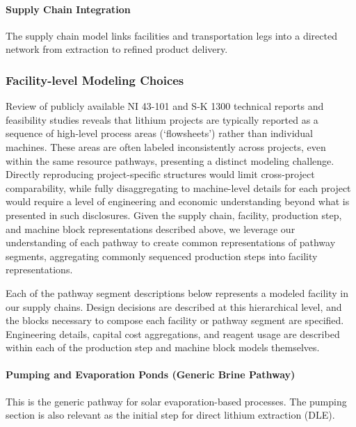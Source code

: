 \documentclass{article}
\renewcommand\_{\textunderscore\allowbreak}
\begin{document}
\paragraph{Supply Chain Integration}\label{app:04-methods-system-sc}\leavevmode\par

The supply chain model links facilities and transportation legs into a directed network from extraction to refined product delivery.

\clearpage
\subsubsection{Facility-level Modeling Choices}\label{app:04-methods-facilitychoices}

Review of publicly available NI 43-101 and S-K 1300 technical reports and feasibility studies reveals that lithium projects are typically reported as a sequence of high-level process areas (`flowsheets') rather than individual machines. These areas are often labeled inconsistently across projects, even within the same resource pathways, presenting a distinct modeling challenge. Directly reproducing project-specific structures would limit cross-project comparability, while fully disaggregating to machine-level details for each project would require a level of engineering and economic understanding beyond what is presented in such disclosures. Given the supply chain, facility, production step, and machine block representations described above, we leverage our understanding of each pathway to create common representations of pathway segments, aggregating commonly sequenced production steps into facility representations.

Each of the pathway segment descriptions below represents a modeled facility in our supply chains. Design decisions are described at this hierarchical level, and the blocks necessary to compose each facility or pathway segment are specified. Engineering details, capital cost aggregations, and reagent usage are described within each of the production step and machine block models themselves.

\paragraph{Pumping and Evaporation Ponds (Generic Brine Pathway)}\label{app:04-methods-facilitychoices-pumpponds}\leavevmode\par

This is the generic pathway for solar evaporation-based processes. The pumping section is also relevant as the initial step for direct lithium extraction (DLE).
\end{document}
